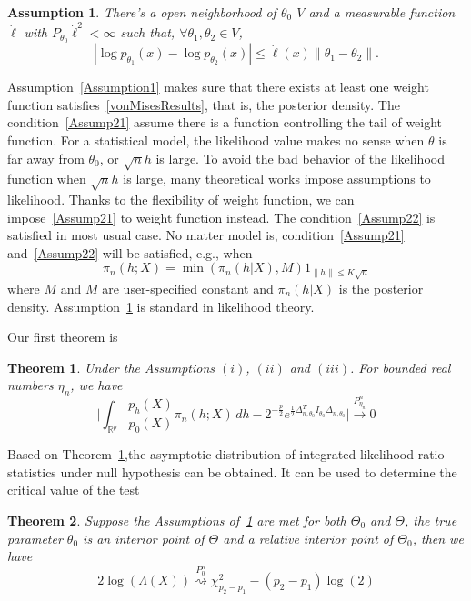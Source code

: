\documentclass[3p]{elsarticle}
\newtheorem{theorem}{Theorem}
\newtheorem{assumption}{\quad\quad Assumption}
\begin{document}
\begin{assumption}\label{Assumption3}
        There's a open neighborhood of $\theta_0$ $V$ and a measurable function $\dot{\ell}$ with $P_{\theta_0}\dot{\ell}^2<\infty$ such that, $\forall \theta_1,\theta_2\in V$,
        \begin{equation}
            |\log p_{\theta_1}(x)-\log p_{\theta_2}(x)|\leq \dot{\ell}(x)\|\theta_1-\theta_2\|.
        \end{equation}
\end{assumption}

Assumption~\ref{Assumption1} makes sure that there exists at least one weight function satisfies~\ref{vonMisesResults}, that is, the posterior density.
The condition~\ref{Assump21} assume there is a function controlling the tail of weight function. For a statistical model, the likelihood value makes no sense when $\theta$ is far away from $\theta_0$, or $\sqrt{n}h$ is large. To avoid the bad behavior of the likelihood function when $\sqrt{n}h$ is large, many theoretical works impose assumptions to likelihood. Thanks to the flexibility of weight function, we can impose~\ref{Assump21} to weight function instead. The condition~\ref{Assump22} is
satisfied in most usual case. No matter model is, condition~\ref{Assump21} and~\ref{Assump22} will be
satisfied, e.g., when 
\begin{equation}
    \pi_n(h;X)=\min(\pi_n(h|X),M) 1_{\|h\|\leq K\sqrt{n}}
\end{equation}
where $M$ and $M$ are user-specified constant and $\pi_n(h|X)$ is the posterior density.
Assumption~\ref{Assumption3} is standard in likelihood theory.

Our first theorem is
\begin{theorem}\label{theoremMain}
    Under the Assumptions $(i)$, $(ii)$ and $(iii)$. For bounded real numbers $\eta_n$, we have
    \begin{equation}
        \Big|\int_{\mathbb{R}^{p}}\frac{p_h(X)}{p_0(X)}\pi_n(h;X)\,dh-
        2^{-\frac{p}{2}}e^{\frac{1}{2}\Delta_{n,\theta_0}^T I_{\theta_0}\Delta_{n,\theta_0}}
        \Big|\xrightarrow{P_{\eta_n}^n}0
    \end{equation}
\end{theorem}


Based on Theorem~\ref{theoremMain},the asymptotic distribution of integrated likelihood ratio statistics under null hypothesis can be obtained. It can be used to determine the critical value of the test
\begin{theorem}\label{theoremWilks}
    Suppose the Assumptions of~\ref{theoremMain} are met for both $\Theta_0$ and $\Theta$,  the true parameter $\theta_0$ is an interior point of $\Theta$ and a relative interior point of $\Theta_0$, then we have
\begin{equation}
    2\log(\Lambda(X))\overset{P_0^n}{\rightsquigarrow} \chi^2_{p_2-p_1}-(p_2-p_1)\log(2)
\end{equation}

\end{theorem}
\end{document}
